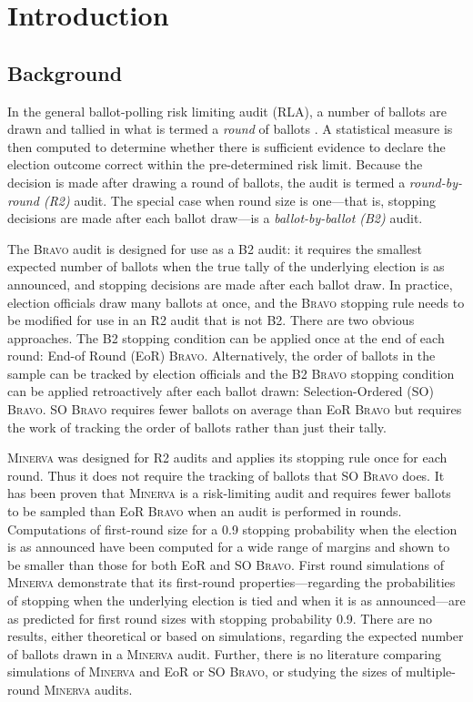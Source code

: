 \documentclass[runningheads]{llncs}
\newcommand{\Minerva}{\textsc{Minerva}\xspace}
\newcommand{\BRAVO}{\textsc{Bravo}\xspace}
\begin{document}
\section{Introduction}
\subsection{Background}
In the general ballot-polling risk limiting audit (RLA), a number of ballots are drawn and tallied in what is termed a {\em round} of ballots \cite{usenix_minerva}. A statistical measure is then computed to determine whether there is sufficient evidence to declare the election outcome correct within the pre-determined risk limit. Because the decision is made after drawing a round of ballots, the audit is termed a {\em round-by-round (R2)} audit. The special case when round size is one---that is, stopping decisions are made after each ballot draw---is a {\em ballot-by-ballot (B2)} audit. 

The \BRAVO audit is designed for use as a B2 audit: it requires the smallest expected number of ballots when the true tally of the underlying election is as announced, and stopping decisions are made after each ballot draw. In practice, election officials draw many ballots at once, and the \BRAVO stopping rule needs to be modified for use in an R2 audit that is not B2. There are two obvious approaches. The B2 stopping condition can be applied once at the end of each round: End-of Round (EoR) \BRAVO.  Alternatively, the order of ballots in the sample can be tracked by election officials and the B2 \BRAVO stopping condition can be applied retroactively after each ballot drawn: Selection-Ordered (SO) \BRAVO. SO \BRAVO requires fewer ballots on average than EoR \BRAVO but requires the work of tracking the order of ballots rather than just their tally.

\Minerva was designed for R2 audits and applies its stopping rule once for each round. Thus it does not require the tracking of ballots that SO \BRAVO does. It has been proven that \Minerva is a risk-limiting audit and requires fewer ballots to be sampled than EoR \BRAVO when an audit is performed in rounds. Computations of first-round size for a 0.9 stopping probability when the election is as announced have been computed for a wide range of margins and shown to be smaller than those for both EoR and SO \BRAVO. First round simulations of \Minerva \cite{arxiv_athena} demonstrate that its first-round properties---regarding the probabilities of stopping when the underlying election is tied and when it is as announced---are as predicted for first round sizes with stopping probability 0.9. There are no results, either theoretical or based on simulations, regarding the expected number of ballots drawn in a \Minerva audit. Further, there is no literature comparing simulations of \Minerva and EoR or SO \BRAVO, or studying the sizes of multiple-round \Minerva audits. 
\end{document}

